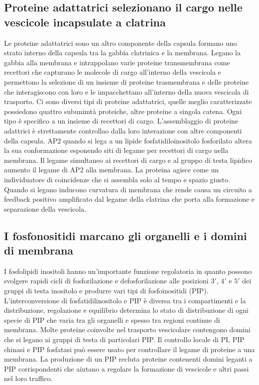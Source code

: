 \subsection{Proteine adattatrici selezionano il cargo nelle vescicole incapsulate a clatrina}
Le proteine adattatrici sono un altro componente della capsula formano uno strato interno della capsula tra la gabbia clatrinica e la membrana. Legano la gabbia alla membrana e 
intrappolano varie proteine transmembrana come recettori che capturano le molecole di cargo all'interno della vescicola e permettono la selezione di un insieme di proteine trasmembrana
e delle proteine che interagiscono con loro e le impacchettano all'interno della nuova vescicola di trasporto. Ci sono diversi tipi di proteine adattatrici, quelle meglio caratterizzate
possiedono quattro subunimt\`a proteiche, altre proteine a singola catena. Ogni tipo \`e specifico a un insieme di recettori di cargo. L'assemblaggio di proteine adattrici \`e 
strettamente controllao dalla loro interazione con altre componenti della capsula. AP2 quando si lega a un lipide fosfatidiloinositolo fosforilato altera la sua conformazione esponendo 
siti di legame per recettori di cargo nella membrana. Il legame simultaneo ai recettori di cargo e al gruppo di testa lipidico aumento il legame di AP2 alla membrana. La proteina
agisce come un individuatore di coincidenze che si assembla solo al tempo e spazio giusto. Quando si legano inducono curvatura di membrana che rende causa un circuito a feedback 
positivo amplificato dal legame della clatrina che porta alla formazione e separazione della vescicola. 
\subsection{I fosfonositidi marcano gli organelli e i domini di membrana}
I fosfolipidi inositoli hanno un'importante funzione regolatoria in quanto possono svolgere rapidi cicli di fosforilazione e defosforilazione alle posizioni $3'$, $4'$ e $5'$ dei gruppi
di testa inositolo e produrre vari tipi di fosfoinositidi (PIP). L'interconversione di fosfatidilinositolo e PIP \`e diversa tra i compartimenti e la distribuzione, regolazione e 
equilibrio  determina lo stato di distribuzione di ogni specie di PIP che varia tra gli organelli e spesso tra regioni continue di membrana. Molte proteine coinvolte nel trasporto 
vescicolare contengono domini che si legano  ai gruppi di testa di particolari PIP. Il controllo locale di PI, PIP chinasi e PIP fosfatasi pu\`o essere usato per controllare il legame 
di proteine a una membrana. La produzione di un PIP recluta proteine contenenti domini leganti a PIP corrispondenti che aiutano a regolare la formazione di vescicole e altri passi nel
loro traffico. 
